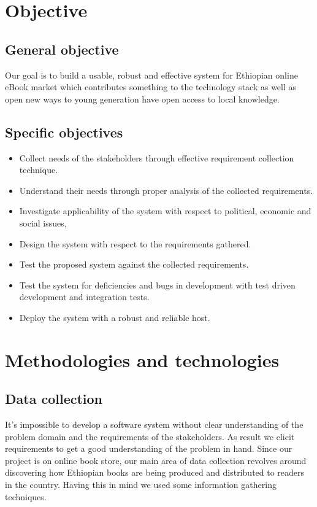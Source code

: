 	\section{Objective}
		\subsection{General objective}

Our goal is to build a usable, robust and effective system for Ethiopian online eBook market which contributes something to the technology stack as well as open new ways to young generation have open access to local knowledge.

		\subsection{Specific objectives}

\begin{itemize}
	\item Collect needs of the stakeholders through effective requirement collection technique.
	\item Understand their needs through proper analysis of the collected requirements.
   \item Investigate applicability of the system with respect to political, economic and social issues,
	\item Design the system with respect to the requirements gathered.
	\item Test the proposed system against the collected requirements.
   \item Test the system for deficiencies and bugs in development with test driven development and integration tests.
	\item Deploy the system with a robust and reliable host.	
\end{itemize}

	\section{Methodologies and technologies}
		\subsection{Data collection}

It's impossible to develop a software system without clear understanding of the problem domain and the requirements of the stakeholders. As result we elicit requirements to get a good understanding of the problem in hand. Since our project is on online book store, our main area of data collection revolves around discovering how Ethiopian books are being produced and distributed to readers in the country. Having this in mind we used some information gathering techniques.


